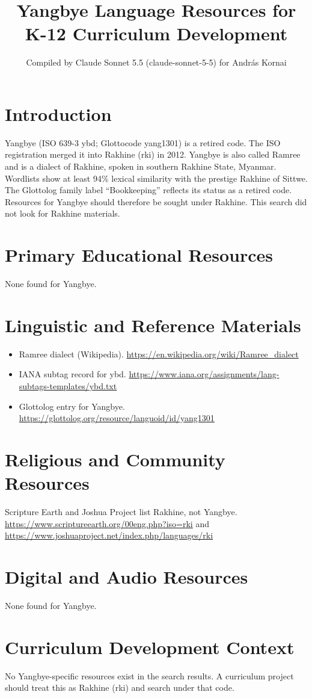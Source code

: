 \documentclass[12pt]{article}
\title{Yangbye Language Resources for K-12 Curriculum Development}
\author{Compiled by Claude Sonnet 5.5 (claude-sonnet-5-5) for Andr\'as Kornai}
\date{}
\begin{document}
\maketitle

\section{Introduction}
Yangbye (ISO 639-3 ybd; Glottocode yang1301) is a retired code. The ISO registration merged it into Rakhine (rki) in 2012. Yangbye is also called Ramree and is a dialect of Rakhine, spoken in southern Rakhine State, Myanmar. Wordlists show at least 94\% lexical similarity with the prestige Rakhine of Sittwe. The Glottolog family label ``Bookkeeping'' reflects its status as a retired code. Resources for Yangbye should therefore be sought under Rakhine. This search did not look for Rakhine materials.

\section{Primary Educational Resources}
None found for Yangbye.

\section{Linguistic and Reference Materials}
\begin{itemize}
\item Ramree dialect (Wikipedia). \url{https://en.wikipedia.org/wiki/Ramree_dialect}
\item IANA subtag record for ybd. \url{https://www.iana.org/assignments/lang-subtags-templates/ybd.txt}
\item Glottolog entry for Yangbye. \url{https://glottolog.org/resource/languoid/id/yang1301}
\end{itemize}

\section{Religious and Community Resources}
Scripture Earth and Joshua Project list Rakhine, not Yangbye. \url{https://www.scriptureearth.org/00eng.php?iso=rki} and \url{https://www.joshuaproject.net/index.php/languages/rki}

\section{Digital and Audio Resources}
None found for Yangbye.

\section{Curriculum Development Context}
No Yangbye-specific resources exist in the search results. A curriculum project should treat this as Rakhine (rki) and search under that code.
\end{document}
